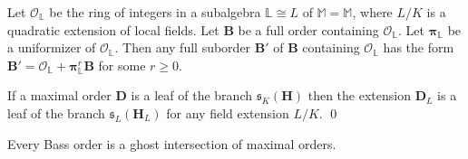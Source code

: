 \documentclass[10pt,a4paper]{amsart}
\newcommand\Ba{\mathbf B}
\newcommand\Da{\mathbf{D}}
\newcommand\Ha{\mathbf{H}}
\newcommand\alge{\mathbb{M}}
\newcommand\lu{\mathbb{L}}
\begin{document}
\begin{lemma}\label{l43n}
Let $\mathcal{O}_\lu$ be the ring of 
integers in a subalgebra $\lu\cong L$
of $\alge=\alge $, where $L/K$ is a 
quadratic extension of local fields.
Let $\Ba$ be a full order containing 
$\mathcal{O}_\lu$. Let
$\boldsymbol{\pi}_\lu$ be a uniformizer
of $\mathcal{O}_\lu$.
Then any full suborder $\Ba'$ of $\Ba$ containing 
$\mathcal{O}_\lu$ has the form $\Ba'=
\mathcal{O}_\lu+\boldsymbol{\pi}_\lu^r\Ba$
for some $r\geq0$.
\end{lemma}

\begin{lemma}\label{c3x}
    If a maximal order $\Da$ is a leaf of the branch $\mathfrak{s}_K(\Ha)$ then the extension
    $\Da_L$ is a leaf of the branch 
    $\mathfrak{s}_L(\Ha_L)$ for any field extension
    $L/K$.   \qed 
\end{lemma}

\begin{proposition}\label{p45}
    Every Bass order is a ghost intersection of maximal orders.
\end{proposition}
\end{document}
